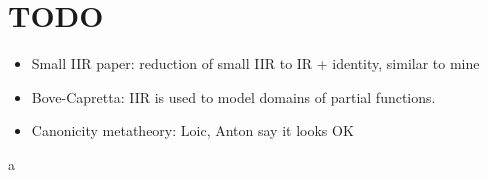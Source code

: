 \documentclass[acmsmall,screen,review,anonymous]{acmart}
\begin{document}
\section{TODO}

\begin{itemize}
  \item Small IIR paper: reduction of small IIR to IR + identity, similar to mine
  \item Bove-Capretta: IIR is used to model domains of partial functions.
  \item Canonicity metatheory: Loic, Anton say it looks OK
\end{itemize}a


































\end{document}
